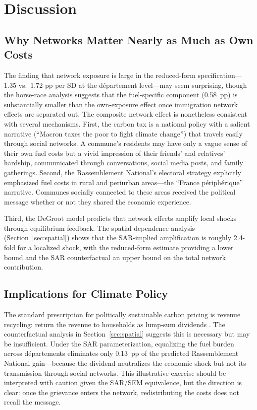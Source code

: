 \documentclass[12pt]{article}
\newcommand{\rn}{Rassemblement National}
\newcommand{\dept}{d\'{e}partement}
\newcommand{\depts}{d\'{e}partements}
\begin{document}

\section{Discussion}
\label{sec:discussion}

\subsection{Why Networks Matter Nearly as Much as Own Costs}

The finding that network exposure is large in the reduced-form specification---1.35 vs.\ 1.72 pp per SD at the \dept{} level---may seem surprising, though the horse-race analysis suggests that the fuel-specific component (0.58~pp) is substantially smaller than the own-exposure effect once immigration network effects are separated out. The composite network effect is nonetheless consistent with several mechanisms. First, the carbon tax is a national policy with a salient narrative (``Macron taxes the poor to fight climate change'') that travels easily through social networks. A commune's residents may have only a vague sense of their own fuel costs but a vivid impression of their friends' and relatives' hardship, communicated through conversations, social media posts, and family gatherings. Second, the \rn{}'s electoral strategy explicitly emphasized fuel costs in rural and periurban areas---the ``France p\'{e}riph\'{e}rique'' narrative. Communes socially connected to these areas received the political message whether or not they shared the economic experience.

Third, the DeGroot model predicts that network effects amplify local shocks through equilibrium feedback. The spatial dependence analysis (Section~\ref{sec:spatial}) shows that the SAR-implied amplification is roughly 2.4-fold for a localized shock, with the reduced-form estimate providing a lower bound and the SAR counterfactual an upper bound on the total network contribution.

\subsection{Implications for Climate Policy}

The standard prescription for politically sustainable carbon pricing is revenue recycling: return the revenue to households as lump-sum dividends \citep{klenert2018carbon, stiglitz2019addressing}. The counterfactual analysis in Section~\ref{sec:spatial} suggests this is necessary but may be insufficient. Under the SAR parameterization, equalizing the fuel burden across \depts{} eliminates only 0.13~pp of the predicted \rn{} gain---because the dividend neutralizes the economic shock but not its transmission through social networks. This illustrative exercise should be interpreted with caution given the SAR/SEM equivalence, but the direction is clear: once the grievance enters the network, redistributing the costs does not recall the message.
\end{document}
